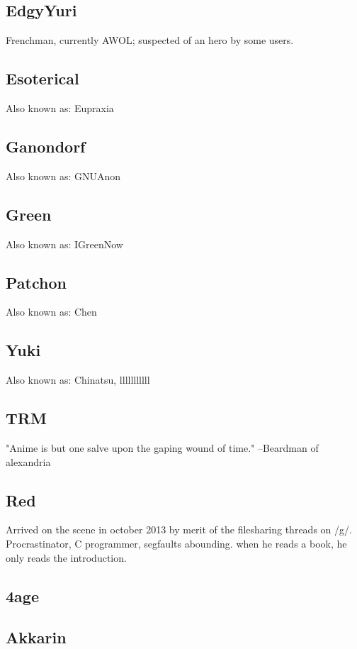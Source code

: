 \documentclass[12pt]{report}
\begin{document}
{{        \subsection{EdgyYuri}
        Frenchman, currently AWOL; suspected of an hero by some users.

        \subsection{Esoterical}
        Also known as: Eupraxia

        \subsection{Ganondorf}
        Also known as: GNUAnon

        \subsection{Green}
        Also known as: IGreenNow

        \subsection{Patchon}
        Also known as: Chen

        \subsection{Yuki}
        Also known as: Chinatsu, lllllllllll

        \subsection{TRM}
        "Anime is but one salve upon the gaping wound of time." --Beardman of alexandria

        \subsection{Red}
        Arrived on the scene in october 2013 by merit of the filesharing threads on /g/.
        Procrastinator, C programmer, segfaults abounding.
        when he reads a book, he only reads the introduction.

        \subsection{4age}
        \subsection{Akkarin}
}}
\end{document}
